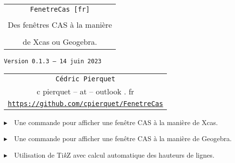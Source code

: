 \documentclass[french,a4paper,11pt]{article}
\def\TPversion{0.1.3}
\def\TPdate{14 juin 2023}
\providecommand\tikzlogo{Ti\textit{k}Z}
\let\TikZ\tikzlogo
\begin{document}
\setlength{\aweboxleftmargin}{0.07\linewidth}
\setlength{\aweboxcontentwidth}{0.93\linewidth}
\setlength{\aweboxvskip}{8pt}

\pagestyle{fancy}

\thispagestyle{empty}

\vspace{2cm}

\begin{center}
	\begin{minipage}{0.75\linewidth}
	\begin{tcolorbox}[colframe=yellow,colback=yellow!15]
		\begin{center}
			\begin{tabular}{c}
				{\Huge \texttt{FenetreCas [fr]}}\\
				\\
				{\LARGE Des fenêtres CAS à la manière} \\
				\\
				{\LARGE de Xcas ou Geogebra.} \\
			\end{tabular}
			
			\bigskip
			
			{\small \texttt{Version \TPversion{} -- \TPdate}}
		\end{center}
	\end{tcolorbox}
\end{minipage}
\end{center}

\begin{center}
	\begin{tabular}{c}
	\texttt{Cédric Pierquet}\\
	{\ttfamily c pierquet -- at -- outlook . fr}\\
	\texttt{\url{https://github.com/cpierquet/FenetreCas}}
\end{tabular}
\end{center}

\vspace{0.25cm}

{$\blacktriangleright$~~Une commande pour afficher une fenêtre CAS à la manière de \textsf{Xcas}.}

\smallskip

{$\blacktriangleright$~~Une commande pour afficher une fenêtre CAS à la manière de \textsf{Geogebra}.}

\smallskip

{$\blacktriangleright$~~Utilisation de \TikZ{} avec calcul automatique des hauteurs de lignes.}
\end{document}
